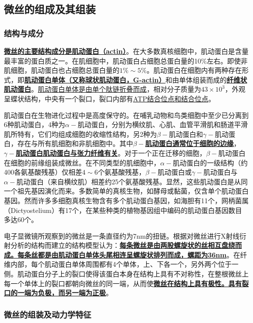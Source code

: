 \subsection{微丝的组成及其组装}

\subsubsection{结构与成分}

\textbf{\underline{微丝的主要结构成分是肌动蛋白（actin）}}。在大多数真核细胞中，肌动蛋白是含量最丰富的蛋白质之一。在肌细胞中，肌动蛋白占细胞总蛋白量的10\%左右。即使非肌细胞，肌动蛋白也占细胞总蛋白量的$ 1\% \sim 5\% $。肌动蛋白在细胞内有两种存在形式，即\textbf{\underline{肌动蛋白单体（又称球状肌动蛋白，G-actin）}}和由单体组装而成的\textbf{\underline{纤维状肌动蛋白}}。\underline{肌动蛋白单体是由单个肽链折叠而成}，相对分子质量为$ 43\times 10^{3} $，外观呈蝶状结构，中央有一个裂口，裂口内部有\underline{ATP结合位点和结合位点}。

肌动蛋白在生物进化过程中是高度保守的。在哺乳动物和鸟类细胞中至少已分离到6种肌动蛋白，4种为$ \alpha- $肌动蛋白，分别为横纹肌、心肌、血管平滑肌和肠道平滑肌所特有，它们均组成细胞的收缩性结构，另2种为$ \beta- $肌动蛋白和$ \gamma- $肌动蛋白，存在与所有肌细胞和非肌细胞中。其中\textbf{\underline{$ \beta- $肌动蛋白通常位于细胞的边缘}}，\textbf{\underline{$ \gamma- $肌动蛋白肌动蛋白与张力纤维有关}}。对于一个正在迁移的细胞，$ \beta- $肌动蛋白在细胞的前缘组装成微丝。在不同类型的肌细胞中，$ \alpha- $肌动蛋白的一级结构（约400各氨基酸残基）仅相差$ 4 \sim 6 $个氨基酸残基，$ \beta- $肌动蛋白或$ \gamma- $肌动蛋白与$ \alpha- $肌动蛋白（来自横纹肌）相差约25个氨基酸残基。显然，这些肌动蛋白是从同一个祖先基因演化而来。多数简单的真核生物，如酵母或黏菌，仅含单个肌动蛋白基因。然而许多多细胞真核生物含有多个肌动蛋白基因，如海胆有11个，网柄菌属（Dictyostelium）有17个，在某些种类的植物基因组中编码的肌动蛋白基因数目多达60个。

电子显微镜所观察到的微丝是一条直径约为7nm的扭链。根据对微丝进行X射线衍射分析的结构而建立的结构模型认为：\textbf{\underline{每条微丝是由两股螺旋状的丝相互盘绕而成。每条丝都是由肌动蛋白单体头尾相连呈螺旋状排列而成，螺距为36nm}}。在纤维内部，每个肌动蛋白单体周围都有4个单体，上、下各一个，另外两个位于一侧。肌动蛋白分子上的裂口使得该蛋白本身在结构上具有不对称性，在整根微丝上每一个单体上的裂口都朝向微丝的同一端，从而使\textbf{\underline{微丝在结构上具有极性。具有裂口的一端为负极，而另一端为正极}}。

\subsubsection{微丝的组装及动力学特征}

